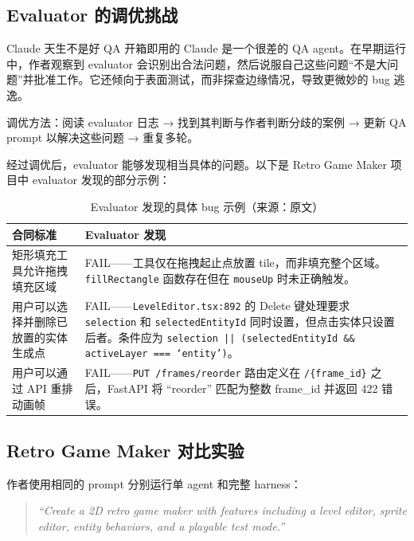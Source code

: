 \subsection{Evaluator 的调优挑战}

\begin{warningbox}{Claude 天生不是好 QA}
开箱即用的 Claude 是一个很差的 QA agent。在早期运行中，作者观察到 evaluator 会识别出合法问题，然后说服自己这些问题``不是大问题''并批准工作。它还倾向于表面测试，而非探查边缘情况，导致更微妙的 bug 逃逸。

调优方法：阅读 evaluator 日志 → 找到其判断与作者判断分歧的案例 → 更新 QA prompt 以解决这些问题 → 重复多轮。
\end{warningbox}

经过调优后，evaluator 能够发现相当具体的问题。以下是 Retro Game Maker 项目中 evaluator 发现的部分示例：

\begin{table}[H]
\centering
\small
\begin{tabular}{p{4.5cm}p{8.5cm}}
\toprule
\textbf{合同标准} & \textbf{Evaluator 发现} \\
\midrule
矩形填充工具允许拖拽填充区域 & FAIL——工具仅在拖拽起止点放置 tile，而非填充整个区域。\texttt{fillRectangle} 函数存在但在 \texttt{mouseUp} 时未正确触发。 \\
\midrule
用户可以选择并删除已放置的实体生成点 & FAIL——\texttt{LevelEditor.tsx:892} 的 Delete 键处理要求 \texttt{selection} 和 \texttt{selectedEntityId} 同时设置，但点击实体只设置后者。条件应为 \texttt{selection || (selectedEntityId \&\& activeLayer === `entity')}。 \\
\midrule
用户可以通过 API 重排动画帧 & FAIL——\texttt{PUT /frames/reorder} 路由定义在 \texttt{/\{frame\_id\}} 之后，FastAPI 将 ``reorder'' 匹配为整数 frame\_id 并返回 422 错误。 \\
\bottomrule
\end{tabular}
\caption{Evaluator 发现的具体 bug 示例（来源：原文）}
\end{table}

\subsection{Retro Game Maker 对比实验}

作者使用相同的 prompt 分别运行单 agent 和完整 harness：

\begin{quote}
\textit{``Create a 2D retro game maker with features including a level editor, sprite editor, entity behaviors, and a playable test mode.''}
\end{quote}

